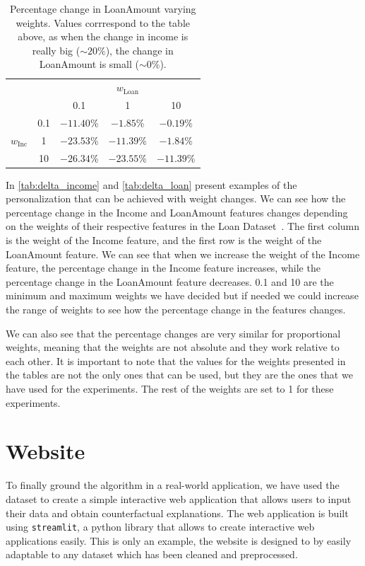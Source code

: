\documentclass[12pt]{extarticle}
\numberwithin{equation}{section}
\begin{document}
\begin{table}[ht]
    \centering
    \begin{tabular}{cc|ccc}
             &                 & \multicolumn{3}{c}{$w_{\text{Loan}}$} \\
     & & 0.1 & 1 & 10 \\
     \cmidrule(l){1-5}
    \multirow{3}{*}{$w_{\text{Inc}}$}
            & 0.1 & $-11.40$\% &  $-1.85$\% &  $-0.19$\% \\
            & 1   & $-23.53$\% & $-11.39$\% &  $-1.84$\% \\
            & 10  & $-26.34$\% & $-23.55$\% & $-11.39$\% \\
    \bottomrule
\end{tabular}

    \caption{Percentage change in LoanAmount varying weights. Values corrrespond to the table above, as when the change in income is really big ($\sim20\%$), the change in LoanAmount is small ($\sim0\%$).}
    \label{tab:delta_loan}
\end{table}

In \autoref{tab:delta_income} and \autoref{tab:delta_loan} present examples of the personalization that can be achieved with weight changes. We can see how the percentage change in the Income and LoanAmount features changes depending on the weights of their respective features in the Loan Dataset~\cite{kaggleLoan1}. The first column is the weight of the Income feature, and the first row is the weight of the LoanAmount feature. We can see that when we increase the weight of the Income feature, the percentage change in the Income feature increases, while the percentage change in the LoanAmount feature decreases. 0.1 and 10 are the minimum and maximum weights we have decided but if needed we could increase the range of weights to see how the percentage change in the features changes. 

We can also see that the percentage changes are very similar for proportional weights, meaning that the weights are not absolute and they work relative to each other. It is important to note that the values for the weights presented in the tables are not the only ones that can be used, but they are the ones that we have used for the experiments. The rest of the weights are set to 1 for these experiments.

\section{Website}\label{sec:website}
To finally ground the algorithm in a real-world application, we have used the ~\cite{kaggleLoan1} dataset to create a simple interactive web application that allows users to input their data and obtain counterfactual explanations. The web application is built using \texttt{streamlit}, a python library that allows to create interactive web applications easily. This is only an example, the website is designed to by easily adaptable to any dataset which has been cleaned and preprocessed. 
\end{document}
